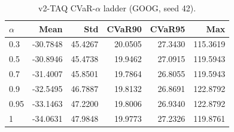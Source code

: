 \begin{table}[H]
    \centering
    \caption{v2-TAQ CVaR-$\alpha$ ladder (GOOG, seed 42).}
    \label{tab:v2_taq_alpha}
    \begin{tabular}{@{}lrrrrr@{}}
        \toprule
        $\alpha$ & Mean & Std & CVaR90 & CVaR95 & Max \\
        \midrule
        0.3 & -30.7848 & 45.4267 & 20.0505 & 27.3430 & 115.3619 \\
        0.5 & -30.8946 & 45.4738 & 19.9462 & 27.0915 & 119.5943 \\
        0.7 & -31.4007 & 45.8501 & 19.7864 & 26.8055 & 119.5943 \\
        0.9 & -32.5495 & 46.7887 & 19.8132 & 26.8691 & 122.8792 \\
        0.95 & -33.1463 & 47.2200 & 19.8006 & 26.9340 & 122.8792 \\
        1 & -34.0631 & 47.9848 & 19.9773 & 27.2326 & 119.8761 \\
        \bottomrule
    \end{tabular}
\end{table}
